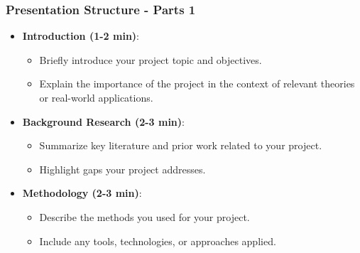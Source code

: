 \documentclass[aspectratio=169]{beamer}
\begin{document}
\begin{frame}[fragile]
    \frametitle{Presentation Structure - Parts 1}
    \begin{itemize}
        \item \textbf{Introduction (1-2 min)}: 
        \begin{itemize}
            \item Briefly introduce your project topic and objectives.
            \item Explain the importance of the project in the context of relevant theories or real-world applications.
        \end{itemize}
        
        \item \textbf{Background Research (2-3 min)}:
        \begin{itemize}
            \item Summarize key literature and prior work related to your project.
            \item Highlight gaps your project addresses.
        \end{itemize}
        
        \item \textbf{Methodology (2-3 min)}: 
        \begin{itemize}
            \item Describe the methods you used for your project.
            \item Include any tools, technologies, or approaches applied.
        \end{itemize}
    \end{itemize}
\end{frame}
\end{document}

